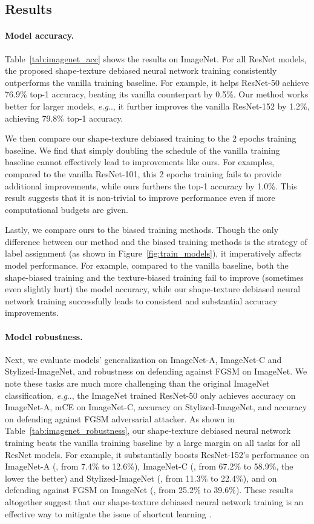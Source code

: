 \documentclass{article} \usepackage{iclr2021_conference,times}
\makeatletter
\DeclareRobustCommand\onedot{\futurelet\@let@token\@onedot}
\def\@onedot{\ifx\@let@token.\else.\null\fi\xspace}
\def\eg{\emph{e.g}\onedot} \def\Eg{\emph{E.g}\onedot}
\makeatother
\begin{document}
\subsection{Results}\label{sec:main_results}

\paragraph{Model accuracy.} 
Table~\ref{tab:imagenet_acc} shows the results on ImageNet. 
For all ResNet models, the proposed shape-texture debiased neural network training consistently outperforms the vanilla training baseline. For example, it helps ResNet-50 achieve 76.9\% top-1 accuracy, beating its vanilla counterpart by 0.5\%. Our method works better for larger models, \eg, it further improves the vanilla ResNet-152 by 1.2\%, achieving 79.8\% top-1 accuracy. 

We then compare our shape-texture debiased training to the 2 epochs training baseline. We find that simply doubling the schedule of the vanilla training baseline cannot effectively lead to improvements like ours. For examples, compared to the vanilla ResNet-101, this 2 epochs training fails to provide additional improvements, while ours furthers the top-1 accuracy by 1.0\%. This result suggests that it is non-trivial to improve performance even if more computational budgets are given.


Lastly, we compare ours to the biased training methods. Though the only difference between our method and the biased training methods is the strategy of label assignment (as shown in Figure~\ref{fig:train_models}), it imperatively affects model performance. For example, compared to the vanilla baseline, both the shape-biased training and the texture-biased training fail to improve (sometimes even slightly hurt) the model accuracy, while our shape-texture debiased neural network training successfully leads to consistent and substantial accuracy improvements.

\paragraph{Model robustness.}
Next, we evaluate models' generalization on ImageNet-A, ImageNet-C and Stylized-ImageNet, and robustness on defending against FGSM on ImageNet. 
We note these tasks are much more challenging than the original ImageNet classification, \eg, the ImageNet trained ResNet-50 only achieves  accuracy  on ImageNet-A,   mCE on ImageNet-C,   accuracy on Stylized-ImageNet, and  accuracy on defending against FGSM adversarial attacker.
As shown in Table~\ref{tab:imagenet_robustness}, our shape-texture debiased neural network training beats the vanilla training baseline by a large margin on all tasks for all ResNet models. 
For example, it substantially boosts ResNet-152's performance on ImageNet-A (, from 7.4\% to 12.6\%), ImageNet-C (, from 67.2\% to 58.9\%, the lower the better) and Stylized-ImageNet (, from 11.3\% to 22.4\%), and on defending against FGSM on ImageNet (, from 25.2\% to 39.6\%). These results altogether suggest that our shape-texture debiased neural network training is an effective way to mitigate the issue of shortcut learning \citep{geirhos2020shortcut}. 
\end{document}
